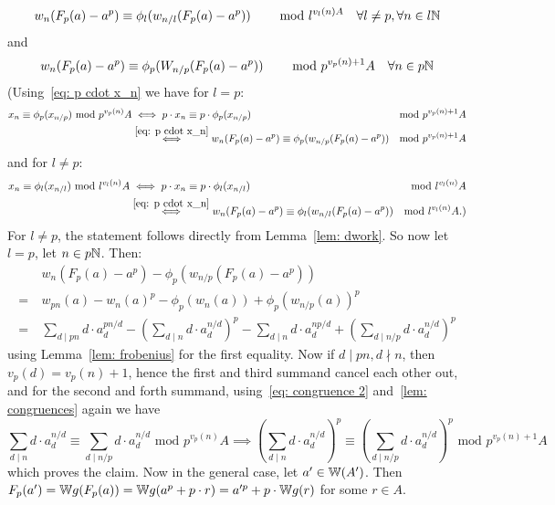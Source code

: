 \begin{beweis}
    \[
        w_n(F_p(a)-a^p) \equiv \phi_l(w_{n/l}(F_p(a)-a^p))
         \text{\hskip8mm mod }l^{v_l(n)A} \quad \forall l \neq p, \forall n \in l\mathbb{N}
    \]
    and 
    \[
      w_n(F_p(a)-a^p) \equiv \phi_p(W_{n/p}(F_p(a)-a^p)) 
      \text{\hskip8mm mod } p^{v_p(n)+1}A \quad \forall n \in p\mathbb{N}
    \]
    (Using~\ref{eq: p cdot x_n} we have for $l=p$:
    \begin{align*}
        x_n \equiv \phi_p(x_{n/p}) \text{ mod }p^{v_p(n)}A
        &\iff p \cdot x_n \equiv p \cdot \phi_p(x_{n/p}) 
        &\text{mod }p^{v_p(n)+1}A \\
        &\overset{\ref{eq: p cdot x_n}}{\iff} w_n(F_p(a)-a^p) \equiv \phi_p(w_{n/p}(F_p(a)-a^p)) 
        &\text{mod }p^{v_p(n)+1}A
    \end{align*}
    and for $l \neq p$: 
    \begin{align*}
        x_n \equiv \phi_l(x_{n/l}) \text{ mod }l^{v_l(n)}A
        &\iff p \cdot x_n \equiv p \cdot \phi_l(x_{n/l}) 
        &\text{mod }l^{v_l(n)}A \\
        &\overset{\ref{eq: p cdot x_n}}{\iff} w_n(F_p(a)-a^p) \equiv \phi_l(w_{n/l}(F_p(a)-a^p)) 
        &\text{mod }l^{v_l(n)}A.)
    \end{align*}
    For $l \neq p$, the statement follows directly from Lemma~\ref{lem: dwork}.
    So now let $l = p$, let $n \in p\mathbb{N}$. Then:
    \begin{align*}
        &w_n(F_p(a)-a^p) - \phi_p(w_{n/p}(F_p(a)-a^p)) \\
        = \ &w_{pn}(a) - w_n(a)^p - \phi_p(w_n(a)) + \phi_p(w_{n/p}(a))^p \\
        = \ &\sum_{d \mid pn}d \cdot a_d^{pn/d} - ( \sum_{d \mid n}d \cdot a_d^{n/d} )^p 
        - \sum_{d \mid n}d \cdot a_d^{np/d} + ( \sum_{d \mid n/p}d \cdot a_d^{n/d} )^p
    \end{align*}
    using Lemma~\ref{lem: frobenius} for the first equality.
    Now if $d \mid pn, d \nmid n$, then $v_p(d) = v_p(n)+1$, hence the first and third summand 
    cancel each other out, and for the second and forth summand, using~\ref{eq: congruence 2} and~\ref{lem: congruences}
    again we have 
    \[
        \sum_{d \mid n}d \cdot a_d^{n/d} \equiv \sum_{d \mid n/p}d \cdot a_d^{n/d}
        \text{ mod }p^{v_p(n)}A
        \implies ( \sum_{d \mid n}d \cdot a_d^{n/d} )^p  \equiv 
        ( \sum_{d \mid n/p}d \cdot a_d^{n/d} )^p
        \text{ mod }p^{v_p(n)+1}A
    \]
    which proves the claim. Now in the general case, let $a' \in \mathbb{W}(A')$.
    Then $F_p(a') = \mathbb{W} g (F_p(a)) = \mathbb{W} g(a^p + p \cdot r) = a'^p + p \cdot \mathbb{W} g(r)$
    for some $r \in A$.
\end{beweis}

